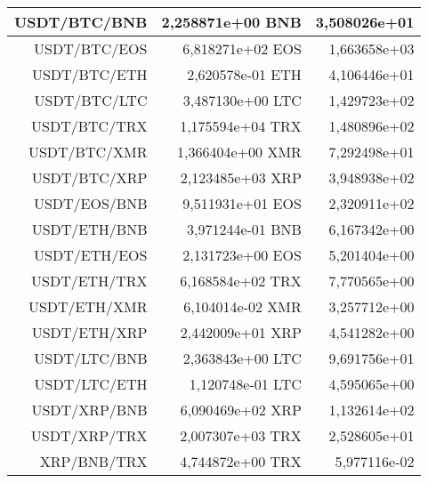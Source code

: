 \begin{table}
\begin{tabular}{|| r | r | r ||}
 \hline USDT/BTC/BNB & 2,258871e+00 BNB & 3,508026e+01\\ 
 \hline USDT/BTC/EOS & 6,818271e+02 EOS & 1,663658e+03\\ 
 \hline USDT/BTC/ETH & 2,620578e-01 ETH & 4,106446e+01\\ 
 \hline USDT/BTC/LTC & 3,487130e+00 LTC & 1,429723e+02\\ 
 \hline USDT/BTC/TRX & 1,175594e+04 TRX & 1,480896e+02\\ 
 \hline USDT/BTC/XMR & 1,366404e+00 XMR & 7,292498e+01\\ 
 \hline USDT/BTC/XRP & 2,123485e+03 XRP & 3,948938e+02\\ 
 \hline USDT/EOS/BNB & 9,511931e+01 EOS & 2,320911e+02\\ 
 \hline USDT/ETH/BNB & 3,971244e-01 BNB & 6,167342e+00\\ 
 \hline USDT/ETH/EOS & 2,131723e+00 EOS & 5,201404e+00\\ 
 \hline USDT/ETH/TRX & 6,168584e+02 TRX & 7,770565e+00\\ 
 \hline USDT/ETH/XMR & 6,104014e-02 XMR & 3,257712e+00\\ 
 \hline USDT/ETH/XRP & 2,442009e+01 XRP & 4,541282e+00\\ 
 \hline USDT/LTC/BNB & 2,363843e+00 LTC & 9,691756e+01\\ 
 \hline USDT/LTC/ETH & 1,120748e-01 LTC & 4,595065e+00\\ 
 \hline USDT/XRP/BNB & 6,090469e+02 XRP & 1,132614e+02\\ 
 \hline USDT/XRP/TRX & 2,007307e+03 TRX & 2,528605e+01\\ 
 \hline XRP/BNB/TRX & 4,744872e+00 TRX & 5,977116e-02\\ 
 \hline
\end{tabular}
\end{table}